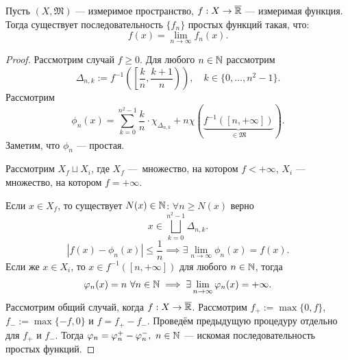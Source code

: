 \begin{theorem}
    Пусть $(X, \mathfrak{M})$ — измеримое пространство,
    $f: X \to \overline{\mathbb{R}}$ — измеримая функция.
    Тогда существует последовательность $\{f_n\}$ простых функций такая, что:
    \[f(x) = \lim\limits_{n \to \infty} f_n(x).\]
\end{theorem} 
\begin{proof}
    Рассмотрим случай $f \geqslant 0$.
    Для любого $n \in \mathbb{N}$ рассмотрим 
    $$\Delta_{n,k} := f^{-1} \left(\left[\frac{k}{n}, \frac{k+1}{n}\right)\right), \quad k \in \{0, \dots, n^2 - 1\}.$$
    Рассмотрим
    \[\phi_n(x) = \sum\limits_{k=0}^{n^2 - 1} \frac{k}{n} \cdot \chi_{\Delta_{n,k}} + n \chi (\underbrace{f^{-1}([n, +\infty])}_{\in \mathfrak{M}}).\]
    Заметим, что $\phi_n$ — простая.

    Рассмотрим $X_f \sqcup X_i$, где $X_f$ — множество, на котором $f< +\infty$, $X_i$ — множество, на котором $f = +\infty$.

    Если $x \in X_f$, то существует $N(x) \in \mathbb{N}$: $\forall n \geqslant N(x)$ верно
    \[x \in \bigsqcup\limits_{k=0}^{n^2 - 1} \Delta_{n,k}.\]
    \[|f(x) - \phi_n(x)| \leqslant \frac{1}{n}
    \implies
    \exists \lim\limits_{n \to \infty} \phi_n(x) = f(x).\]
    Если же $x \in X_i$, то $x \in f^{-1}([n, +\infty])$ для любого $n \in \mathbb{N}$, тогда
    \[\varphi_n(x) = n \ \forall n \in \mathbb{N}
    \implies
    \exists \lim\limits_{n \to \infty} \varphi_n(x) = +\infty.\]
    Рассмотрим общий случай, когда $f: X \to \overline{\mathbb{R}}$.
    Рассмотрим $f_+ := \max\{0,f\}$, $f_- := \max\{-f, 0\}$
    и $f = f_+ - f_-$.
    Проведём предыдущую процедуру отдельно для $f_+$ и $f_-$.
    Тогда $\varphi_n = \varphi_n^+ - \varphi_n^-, \ n \in \mathbb{N}$ — искомая последовательность простых функций.
\end{proof} 
